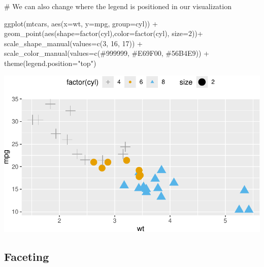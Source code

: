 \documentclass[
  letterpaper,
  DIV=11,
  numbers=noendperiod]{scrreprt}
\newenvironment{Shaded}{\begin{snugshade}}{\end{snugshade}}
\newcommand{\AttributeTok}[1]{\textcolor[rgb]{0.40,0.45,0.13}{#1}}
\newcommand{\CommentTok}[1]{\textcolor[rgb]{0.37,0.37,0.37}{#1}}
\newcommand{\DecValTok}[1]{\textcolor[rgb]{0.68,0.00,0.00}{#1}}
\newcommand{\FunctionTok}[1]{\textcolor[rgb]{0.28,0.35,0.67}{#1}}
\newcommand{\NormalTok}[1]{\textcolor[rgb]{0.00,0.23,0.31}{#1}}
\newcommand{\SpecialCharTok}[1]{\textcolor[rgb]{0.37,0.37,0.37}{#1}}
\newcommand{\StringTok}[1]{\textcolor[rgb]{0.13,0.47,0.30}{#1}}
\begin{document}
\begin{Shaded}
\begin{Highlighting}[]
\CommentTok{\# We can also change where the legend is positioned in our visualization}

\FunctionTok{ggplot}\NormalTok{(mtcars, }\FunctionTok{aes}\NormalTok{(}\AttributeTok{x=}\NormalTok{wt, }\AttributeTok{y=}\NormalTok{mpg, }\AttributeTok{group=}\NormalTok{cyl)) }\SpecialCharTok{+}
  \FunctionTok{geom\_point}\NormalTok{(}\FunctionTok{aes}\NormalTok{(}\AttributeTok{shape=}\FunctionTok{factor}\NormalTok{(cyl),}\AttributeTok{color=}\FunctionTok{factor}\NormalTok{(cyl), }\AttributeTok{size=}\DecValTok{2}\NormalTok{))}\SpecialCharTok{+}
  \FunctionTok{scale\_shape\_manual}\NormalTok{(}\AttributeTok{values=}\FunctionTok{c}\NormalTok{(}\DecValTok{3}\NormalTok{, }\DecValTok{16}\NormalTok{, }\DecValTok{17}\NormalTok{)) }\SpecialCharTok{+}
  \FunctionTok{scale\_color\_manual}\NormalTok{(}\AttributeTok{values=}\FunctionTok{c}\NormalTok{(}\StringTok{\textquotesingle{}\#999999\textquotesingle{}}\NormalTok{, }\StringTok{\textquotesingle{}\#E69F00\textquotesingle{}}\NormalTok{, }\StringTok{\textquotesingle{}\#56B4E9\textquotesingle{}}\NormalTok{)) }\SpecialCharTok{+}
  \FunctionTok{theme}\NormalTok{(}\AttributeTok{legend.position=}\StringTok{"top"}\NormalTok{)}
\end{Highlighting}
\end{Shaded}

\includegraphics{Advanced_Scatterplot_Techniques_files/figure-pdf/unnamed-chunk-12-1.pdf}

\subsection*{Faceting}\label{faceting}
\end{document}

